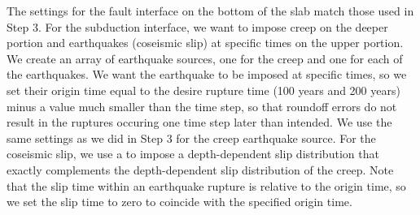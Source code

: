 
The settings for the fault interface on the bottom of the slab match
those used in Step 3. For the subduction interface, we want to
impose creep on the deeper portion and earthquakes (coseismic slip) at
specific times on the upper portion. We create an array of earthquake
sources, one for the creep and one for each of the earthquakes. We
want the earthquake to be imposed at specific times, so we set their
origin time equal to the desire rupture time (100 years and 200 years)
minus a value much smaller than the time step, so that roundoff errors
do not result in the ruptures occuring one time step later than
intended.  We use the same settings as we did in Step 3 for the creep
earthquake source. For the coseismic slip, we use a
 to impose a depth-dependent slip distribution
that exactly complements the depth-dependent slip distribution of the
creep. Note that the slip time within an earthquake rupture is
relative to the origin time, so we set the slip time to zero to
coincide with the specified origin time.
